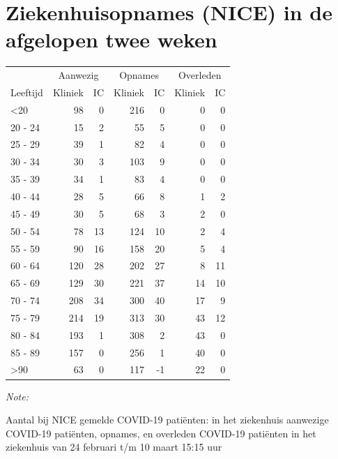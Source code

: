 \documentclass[
  english,
  man,floatsintext]{apa6}
\begin{document}
\newpage

\hypertarget{ziekenhuisopnames-nice-in-de-afgelopen-twee-weken}{%
\section{Ziekenhuisopnames (NICE) in de afgelopen twee weken}\label{ziekenhuisopnames-nice-in-de-afgelopen-twee-weken}}

\begin{table}
\centering\begingroup\fontsize{10}{12}\selectfont

\begin{threeparttable}
\begin{tabular}{lrrrrrr}
\toprule
\multicolumn{1}{c}{ } & \multicolumn{2}{c}{Aanwezig} & \multicolumn{2}{c}{Opnames} & \multicolumn{2}{c}{Overleden} \\
\cmidrule(l{3pt}r{3pt}){2-3} \cmidrule(l{3pt}r{3pt}){4-5} \cmidrule(l{3pt}r{3pt}){6-7}
Leeftijd & Kliniek & IC & Kliniek & IC & Kliniek & IC\\
\midrule
<20 & 98 & 0 & 216 & 0 & 0 & 0\\
20 - 24 & 15 & 2 & 55 & 5 & 0 & 0\\
25 - 29 & 39 & 1 & 82 & 4 & 0 & 0\\
30 - 34 & 30 & 3 & 103 & 9 & 0 & 0\\
35 - 39 & 34 & 1 & 83 & 4 & 0 & 0\\
40 - 44 & 28 & 5 & 66 & 8 & 1 & 2\\
45 - 49 & 30 & 5 & 68 & 3 & 2 & 0\\
50 - 54 & 78 & 13 & 124 & 10 & 2 & 4\\
55 - 59 & 90 & 16 & 158 & 20 & 5 & 4\\
60 - 64 & 120 & 28 & 202 & 27 & 8 & 11\\
65 - 69 & 129 & 30 & 221 & 37 & 14 & 10\\
70 - 74 & 208 & 34 & 300 & 40 & 17 & 9\\
75 - 79 & 214 & 19 & 313 & 30 & 43 & 12\\
80 - 84 & 193 & 1 & 308 & 2 & 43 & 0\\
85 - 89 & 157 & 0 & 256 & 1 & 40 & 0\\
>90 & 63 & 0 & 117 & -1 & 22 & 0\\
\bottomrule
\end{tabular}
\begin{tablenotes}
\item \textit{Note: } 
\item Aantal bij NICE gemelde COVID-19 patiënten: in het ziekenhuis aanwezige COVID-19 patiënten, opnames, en overleden COVID-19 patiënten in het ziekenhuis van 24 februari t/m 10 maart 15:15 uur
\end{tablenotes}
\end{threeparttable}
\endgroup{}
\end{table}
\end{document}
